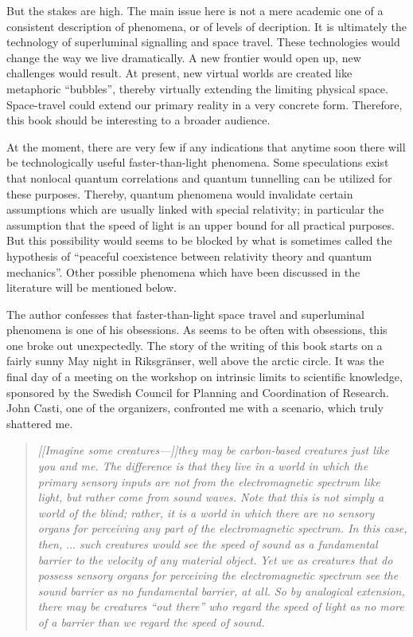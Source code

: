    But the stakes are high.  The  main issue here is not a mere  academic one
of a consistent description of phenomena, or of levels of decription.  It  is
ultimately the technology of superluminal  signalling and space travel.
These technologies would change the way we live dramatically. A new frontier
would open up, new challenges would result. At present, new
virtual worlds are created like metaphoric ``bubbles'', thereby virtually
extending the limiting physical space. Space-travel could extend
our primary reality in a very concrete form. Therefore, this book should be
interesting to a broader audience.

   At the moment,  there are very  few if any  indications that anytime  soon
there  will  be  technologically  useful  faster-than-light  phenomena.  Some
speculations exist that nonlocal quantum correlations and quantum  tunnelling
can  be  utilized  for  these  purposes.    Thereby,  quantum phenomena would
invalidate  certain  assumptions  which  are  usually  linked  with   special
relativity; in particular the assumption that the speed of light is an  upper
bound for all  practical purposes.   But this possibility  would seems to  be
blocked by what is sometimes called the hypothesis of ``peaceful  coexistence
between relativity theory and quantum mechanics''.  Other possible  phenomena
which have been discussed in the literature will be mentioned below.


   The author confesses that faster-than-light space travel and  superluminal
phenomena is one of his obsessions.  As seems to be often with
obsessions,
this one  broke out  unexpectedly.   The story  of the  writing of  this book
starts on a fairly  sunny May night in  Riksgr\"anser, well  above
the arctic  circle. It  was the  final day  of a  meeting on  the
workshop on
intrinsic limits to  scientific knowledge, sponsored  by the Swedish  Council
for  Planning  and  Coordination  of  Research.    John  Casti,  one  of  the
organizers,  confronted  me  with  a  scenario,  which  truly  shattered  me.

\begin{quote}
{\em  [[Imagine  some  creatures---]]they  may be carbon-based
creatures just like you and me.  The difference is that they live in a  world
in which the primary sensory inputs are not from the electromagnetic spectrum
like light, but rather come from sound waves.  Note that this is not simply a
world of  the blind;  rather, it  is a  world in  which there  are no sensory
organs for  perceiving any  part of  the electromagnetic  spectrum.   In this
case,  then,  $\ldots$  such  creatures  would  see  the  speed of sound as a
fundamental  barrier  to  the  velocity  of  any  material object.  Yet we as
creatures  that  {\em   do}  possess  sensory   organs  for  perceiving   the
electromagnetic spectrum see the sound barrier as no fundamental barrier,  at
all.  So by  analogical extension, there may  be creatures ``out there''  who
regard the speed of light as no more of a barrier than we regard the speed of
sound.  }
\end{quote}


